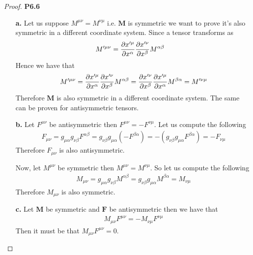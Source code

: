 \documentclass[11pt]{article}
\theoremstyle{definition}
\begin{document}
\begin{proof}{\textbf{P6.6}}
    \begin{itemize}
        \item [\textbf{a.}] Let us suppose $M^{\mu\nu} = M^{\nu\mu}$ i.e.
        $\bm{M}$ is symmetric we want to prove it's also symmetric
        in a different coordinate system. Since a tensor transforms as
        \begin{align*}
            M'^{\mu\nu} &=
            \partialderivative{x'^\mu}{x^\alpha}
            \partialderivative{x'^\nu}{x^\beta} M^{\alpha\beta}
        \end{align*}
        Hence we have that
        \begin{align*}            
            M'^{\mu\nu} =\partialderivative{x'^\mu}{x^\alpha}
            \partialderivative{x'^\nu}{x^\beta} M^{\alpha\beta}
            = \partialderivative{x'^\nu}{x^\beta}
            \partialderivative{x'^\mu}{x^\alpha}
             M^{\beta\alpha} = M'^{\nu\mu}
        \end{align*}
        Therefore $\bm{M}$ is also symmetric in a different coordinate system.
        The same can be proven for antisymmetric tensors.

        \item [\textbf{b.}] Let $F^{\mu\nu}$ be antisymmetric then
        $F^{\mu\nu} = - F^{\nu\mu}$. Let us compute the following 
        \begin{align*}
            F_{\mu\nu} = g_{\mu\alpha}g_{\nu\beta} F^{\alpha\beta}
            = g_{\nu\beta}g_{\mu\alpha} (-F^{\beta\alpha})
            = -(g_{\nu\beta}g_{\mu\alpha} F^{\beta\alpha})
            = -F_{\nu\mu}
        \end{align*}
        Therefore $F_{\mu\nu}$ is also antisymmetric.

        Now, let $M^{\mu\nu}$ be symmetric then $M^{\mu\nu} = M^{\nu\mu}$.
        So let us compute the following
        \begin{align*}
            M_{\mu\nu} = g_{\mu\alpha}g_{\nu\beta} M^{\alpha\beta}
            = g_{\nu\beta}g_{\mu\alpha} M^{\beta\alpha}
            = M_{\nu\mu}
        \end{align*}
        Therefore $M_{\mu\nu}$ is also symmetric.

        \item [\textbf{c.}] Let $\bm{M}$ be symmetric and $\bm{F}$
        be antisymmetric then we have that
        \begin{align*}
            M_{\mu\nu}F^{\mu\nu} = -M_{\nu\mu}F^{\nu\mu}
        \end{align*}
        Then it must be that $M_{\mu\nu}F^{\mu\nu} = 0$.


\end{itemize}
\end{proof}
\end{document}
